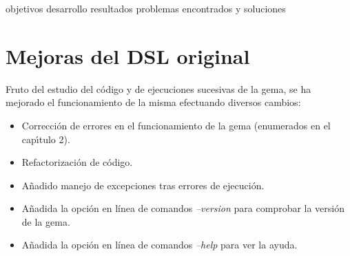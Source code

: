 

objetivos
desarrollo
resultados
problemas encontrados y soluciones


\section{Mejoras del DSL original}
\label{3:sec1}

Fruto del estudio del c\'odigo y de ejecuciones sucesivas de la gema, se ha mejorado el funcionamiento
de la misma efectuando diversos cambios:

\begin{itemize}
  \item Correcci\'on de errores en el funcionamiento de la gema (enumerados en el cap\'{\i}tulo 2).
  \item Refactorizaci\'on de c\'odigo.
  \item A\~{n}adido manejo de excepciones tras errores de ejecuci\'on.
  \item A\~{n}adida la opci\'on en l\'inea de comandos \textit{--version} para comprobar la versi\'on de la gema. 
  \item A\~{n}adida la opci\'on en l\'inea de comandos \textit{--help} para ver la ayuda. 
\end{itemize}


